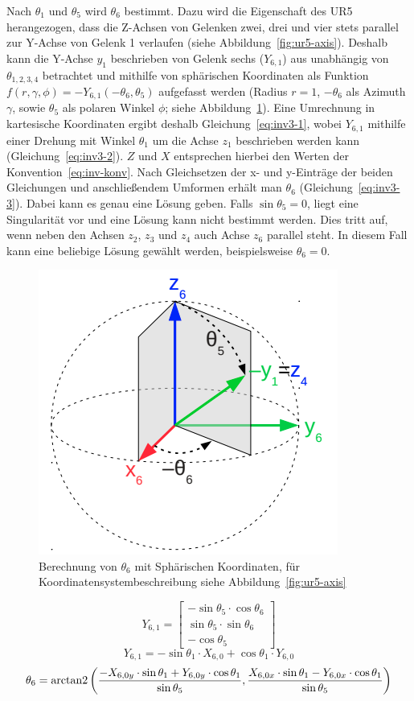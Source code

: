 Nach $\theta_1$ und $\theta_5$ wird $\theta_6$ bestimmt.
Dazu wird die Eigenschaft des UR5 herangezogen, dass die Z-Achsen von Gelenken zwei, drei und vier stets parallel zur Y-Achse von Gelenk 1 verlaufen (siehe Abbildung~\ref{fig:ur5-axis}).
Deshalb kann die Y-Achse $y_1$ beschrieben von Gelenk sechs ($Y_{6,1}$) aus unabhängig von $\theta_{1,2,3,4}$ betrachtet und mithilfe von sphärischen Koordinaten als Funktion $f(r,\gamma,\phi) = -Y_{6,1}(-\theta_6,\theta_5)$ aufgefasst werden (Radius $r=1$, $-\theta_6$ als Azimuth $\gamma$, sowie $\theta_5$ als polaren Winkel $\phi$; siehe Abbildung~\ref{fig:inv1-3}).
Eine Umrechnung in kartesische Koordinaten ergibt deshalb Gleichung~\ref{eq:inv3-1}, wobei $Y_{6,1}$ mithilfe einer Drehung mit Winkel $\theta_1$ um die Achse $z_1$ beschrieben werden kann (Gleichung~\ref{eq:inv3-2}).
$Z$ und $X$ entsprechen hierbei den Werten der Konvention~\ref{eq:inv-konv}.
Nach Gleichsetzen der x- und y-Einträge der beiden Gleichungen und anschließendem Umformen erhält man $\theta_6$ (Gleichung~\ref{eq:inv3-3}).
Dabei kann es genau eine Lösung geben.
Falls $\sin\theta_5=0$, liegt eine Singularität vor und eine Lösung kann nicht bestimmt werden.
Dies tritt auf, wenn neben den Achsen $z_2$, $z_3$ und $z_4$ auch Achse $z_6$ parallel steht.
In diesem Fall kann eine beliebige Lösung gewählt werden, beispielsweise $\theta_6=0$.

\begin{figure}[h]
    \centering
    \includegraphics[width = .4\textwidth]{Bilder/inv3}
    \caption{Berechnung von $\theta_6$ mit Sphärischen Koordinaten, für Koordinatensystembeschreibung siehe Abbildung~\ref{fig:ur5-axis}~\cite{rasmusandersenKinematicsUR52018}}\label{fig:inv1-3}
\end{figure}
\begin{equation}
    Y_{6,1}=
    \begin{bmatrix}
        -\sin\theta_5 \cdot \cos\theta_6 \\ \sin\theta_5 \cdot\sin\theta_6 \\ -\cos\theta_5
    \end{bmatrix}
    \label{eq:inv3-1}
\end{equation}
\begin{equation}
    Y_{6,1}=
    -\sin\theta_1\cdot X_{6,0} + \cos\theta_1\cdot Y_{6,0}
    \label{eq:inv3-2}
\end{equation}
\begin{equation}
    \theta_6=
    \operatorname{arctan2}\left(
    \frac{
        -X_{6,0y} \cdot \sin\theta_1 + Y_{6,0y} \cdot \cos\theta_1
    }{
        \sin\theta_5
    },
    \frac{
        X_{6,0x} \cdot \sin\theta_1 - Y_{6,0x} \cdot \cos\theta_1
    }{
        \sin\theta_5
    }\right)
    \label{eq:inv3-3}
\end{equation}

